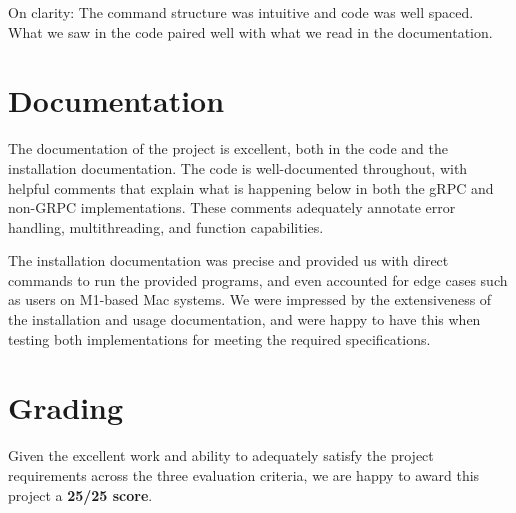 \documentclass[9pt,twocolumn,twoside]{osajnl}
\begin{document}
\medskip

\noindent On clarity: The command structure was intuitive and code was well spaced. What we saw in the code paired well with what we read in the documentation.

\section{Documentation}

The documentation of the project is excellent, both in the code and the installation documentation. The code is well-documented throughout, with helpful comments that explain what is happening below in both the gRPC and non-GRPC implementations. These comments adequately annotate error handling, multithreading, and function capabilities.

\medskip

\noindent The installation documentation was precise and provided us with direct commands to run the provided programs, and even accounted for edge cases such as users on M1-based Mac systems. We were impressed by the extensiveness of the installation and usage documentation, and were happy to have this when testing both implementations for meeting the required specifications.

\section{Grading}
Given the excellent work and ability to adequately satisfy the project requirements across the three evaluation criteria, we are happy to award this project a \textbf{25/25 score}.


  
\end{document}

